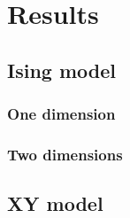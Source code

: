 \section{Results}
\subsection{Ising model}
\subsubsection{One dimension}
\subsubsection{Two dimensions}
\subsection{XY model}